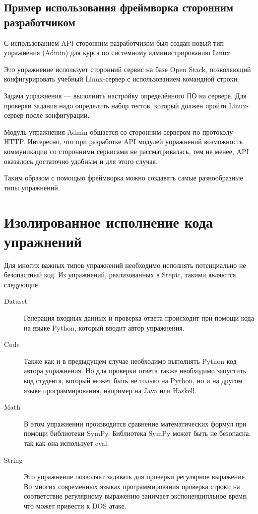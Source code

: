 \documentclass{matmex-diploma-custom}
\begin{document}
\subsection{Пример использования фреймворка сторонним разработчиком}

С использованием API сторонним разработчиком был создан новый тип
упражнения (Admin) для курса по системному администрированию Linux.

Это упражнение использует сторонний сервис на базе Open Stack, позволяющий
конфигурировать учебный Linux-сервер с использованием командной
строки.

Задача упражнения --- выполнить настройку определённого ПО на
сервере. Для проверки задания надо определить набор тестов,
который должен пройти Linux-сервер после конфигурации.

Модуль упражнения Admin общается со сторонним сервером по протоколу
HTTP. Интересно, что при разработке API модулей упражнений возможность
коммуникации со сторонними сервисами не рассматривалась, тем не менее,
API оказалось достаточно удобным и для этого случая.

Таким образом с помощью фреймворка можно создавать самые разнообразные
типы упражнений.

\section{Изолированное исполнение кода упражнений}

Для многих важных типов упражнений необходимо исполнять потенциально
не безопастный код. Из упражнений, реализованных в Stepic, такими
являются следующие.
\begin{description}
\item[Dataset] Генерация входных данных и проверка ответа происходит
  при помощи кода на языке Python, который вводит автор упражнения.
\item[Code] Также как и в предыдущем случае необходимо выполнять
  Python код автора упражнения. Но для проверки ответа также
  необходимо запустить код студента, который может быть не только на
  Python, но и на другом языке программирования, например на Java или
  Haskell.
\item[Math] В этом упражнении производится сравнение математических
  формул при помощи библиотеки SymPy. Библиотека SymPy может быть не
  безопасна, так как она использует eval.
\item[String] Это упражнение позволяет задавать для проверки
  регулярное выражение. Во многих современных языках программирования
  проверка строки на соответствие регулярному выражению занимает
  экспоненципльное время, что может привести к DOS атаке.
\end{description}
\end{document}

